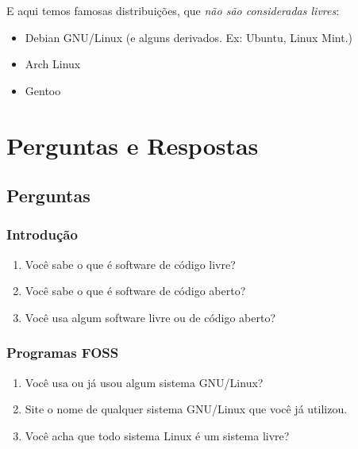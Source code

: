 \documentclass[12pt, a4paper]{report}
\begin{document}
E aqui temos famosas distribuições, que \emph{não são consideradas livres}:

\begin{itemize}

  \item{Debian GNU/Linux (e alguns derivados. Ex: Ubuntu, Linux Mint.)}
  \item{Arch Linux}
  \item{Gentoo}

\end{itemize}

\chapter{Perguntas e Respostas}

\section{Perguntas}

\subsection{Introdução}

\begin{enumerate}

  \item{Você sabe o que é software de código livre?}

  \item{Você sabe o que é software de código aberto?}

  \item{Você usa algum software livre ou de código aberto?}

\end{enumerate}

\subsection{Programas FOSS}

\begin{enumerate}

  \item{Você usa ou já usou algum sistema GNU/Linux?}

  \item{Site o nome de qualquer sistema GNU/Linux que você já utilizou.}

  \item{Você acha que todo sistema Linux é um sistema livre?}

\end{enumerate}
\end{document}
